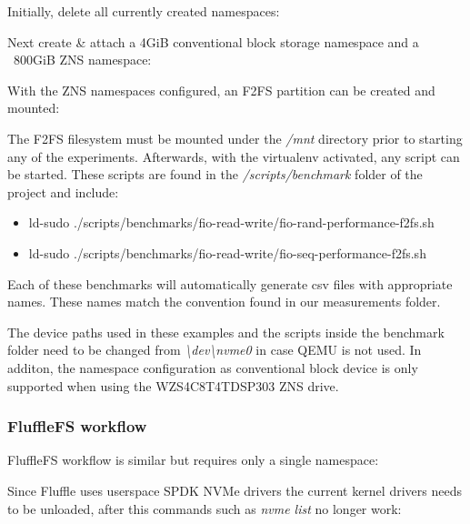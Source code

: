 Initially, delete all currently created namespaces:


Next create \& attach a 4GiB conventional block storage namespace and a
~800GiB ZNS namespace:


With the ZNS namespaces configured, an F2FS partition can be created and
mounted:


The F2FS filesystem must be mounted under the \textit{/mnt} directory prior to
starting any of the experiments. Afterwards, with the virtualenv activated, any
script can be started. These scripts are found in the
\textit{/scripts/benchmark} folder of the project \cite{qemu-csd} and include:

\begin{itemize}
    \item ld-sudo ./scripts/benchmarks/fio-read-write/fio-rand-performance-f2fs.sh
    \item ld-sudo ./scripts/benchmarks/fio-read-write/fio-seq-performance-f2fs.sh
\end{itemize}

Each of these benchmarks will automatically generate csv files with appropriate
names. These names match the convention found in our measurements folder.

The device paths used in these examples and the scripts inside the benchmark
folder need to be changed from \textit{\textbackslash dev\textbackslash nvme0}
in case QEMU is not used. In additon, the namespace configuration as
conventional block device is only supported when using the WZS4C8T4TDSP303 ZNS
drive.

\subsubsection{FluffleFS workflow}

FluffleFS workflow is similar but requires only a single namespace:



Since Fluffle uses userspace SPDK NVMe drivers the current kernel drivers needs
to be unloaded, after this commands such as \textit{nvme list} no longer work:

